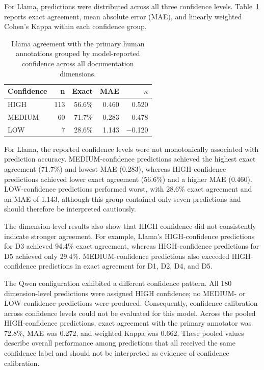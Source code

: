 For Llama, predictions were distributed across all three confidence
levels. Table~\ref{tab:confidence_calibration} reports exact
agreement, mean absolute error (MAE), and linearly weighted Cohen's
Kappa within each confidence group.

\begin{table}[htbp]
\centering
\caption{Llama agreement with the primary human annotations grouped
by model-reported confidence across all documentation dimensions.}
\label{tab:confidence_calibration}
\begin{tabular}{lrrrr}
\hline
\textbf{Confidence} & \textbf{n} & \textbf{Exact} &
\textbf{MAE} & \textbf{$\kappa$} \\
\hline
HIGH   & 113 & 56.6\% & 0.460 & 0.520 \\
MEDIUM & 60  & 71.7\% & 0.283 & 0.478 \\
LOW    & 7   & 28.6\% & 1.143 & $-$0.120 \\
\hline
\end{tabular}
\end{table}

For Llama, the reported confidence levels were not monotonically
associated with prediction accuracy. MEDIUM-confidence predictions
achieved the highest exact agreement (71.7\%) and lowest MAE (0.283),
whereas HIGH-confidence predictions achieved lower exact agreement
(56.6\%) and a higher MAE (0.460). LOW-confidence predictions
performed worst, with 28.6\% exact agreement and an MAE of 1.143,
although this group contained only seven predictions and should
therefore be interpreted cautiously.

The dimension-level results also show that HIGH confidence did not
consistently indicate stronger agreement. For example, Llama's
HIGH-confidence predictions for D3 achieved 94.4\% exact agreement,
whereas HIGH-confidence predictions for D5 achieved only 29.4\%.
MEDIUM-confidence predictions also exceeded HIGH-confidence
predictions in exact agreement for D1, D2, D4, and D5.

The Qwen configuration exhibited a different confidence pattern.
All 180 dimension-level predictions were assigned HIGH confidence;
no MEDIUM- or LOW-confidence predictions were produced. Consequently,
confidence calibration across confidence levels could not be
evaluated for this model. Across the pooled HIGH-confidence
predictions, exact agreement with the primary annotator was 72.8\%,
MAE was 0.272, and weighted Kappa was 0.662. These pooled values
describe overall performance among predictions that all received the
same confidence label and should not be interpreted as evidence of
confidence calibration.

